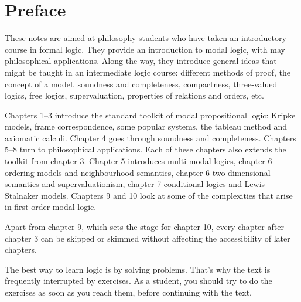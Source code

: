 \chapter*{Preface}\label{ch:preface}

These notes are aimed at philosophy students who have taken an introductory
course in formal logic. They provide an introduction to modal logic, with may
philosophical applications. Along the way, they introduce general ideas that
might be taught in an intermediate logic course: different methods of proof, the
concept of a model, soundness and completeness, compactness, three-valued
logics, free logics, supervaluation, properties of relations and orders, etc.

Chapters 1--3 introduce the standard toolkit of modal propositional logic:
Kripke models, frame correspondence, some popular systems, the tableau method
and axiomatic calculi. Chapter 4 goes through soundness and completeness.
Chapters 5--8 turn to philosophical applications. Each of these chapters also
extends the toolkit from chapter 3. Chapter 5 introduces multi-modal logics,
chapter 6 ordering models and neighbourhood semantics, chapter 6 two-dimensional
semantics and supervaluationism, chapter 7 conditional logics and
Lewis-Stalnaker models. Chapters 9 and 10 look at some of the
complexities that arise in first-order modal logic.

Apart from chapter 9, which sets the stage for chapter 10, every chapter after
chapter 3 can be skipped or skimmed without affecting the accessibility of later
chapters.

The best way to learn logic is by solving problems. That's why the text is
frequently interrupted by exercises. As a student, you should try to do the
exercises as soon as you reach them, before continuing with the text.









